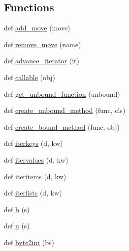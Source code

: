 \subsection*{Functions}
\begin{DoxyCompactItemize}
\item 
def \hyperlink{namespacepip_1_1__vendor_1_1urllib3_1_1packages_1_1six_ad933e7c61c57b643edcbbba25aa25472}{add\+\_\+move} (move)
\item 
def \hyperlink{namespacepip_1_1__vendor_1_1urllib3_1_1packages_1_1six_ab0e0d6749da646c42c4a26e1ebdfe100}{remove\+\_\+move} (name)
\item 
def \hyperlink{namespacepip_1_1__vendor_1_1urllib3_1_1packages_1_1six_abe9c731c8bba88cb511f8f21c81b66bb}{advance\+\_\+iterator} (it)
\item 
def \hyperlink{namespacepip_1_1__vendor_1_1urllib3_1_1packages_1_1six_aef9f895a42a18714e4285adafbe74571}{callable} (obj)
\item 
def \hyperlink{namespacepip_1_1__vendor_1_1urllib3_1_1packages_1_1six_a41cbae8b35e6bfb9c341b85e2ba3dffe}{get\+\_\+unbound\+\_\+function} (unbound)
\item 
def \hyperlink{namespacepip_1_1__vendor_1_1urllib3_1_1packages_1_1six_afb847343e841c1a14e0bb70e3fdda747}{create\+\_\+unbound\+\_\+method} (func, cls)
\item 
def \hyperlink{namespacepip_1_1__vendor_1_1urllib3_1_1packages_1_1six_ad2578848183116f74133f32c10a67993}{create\+\_\+bound\+\_\+method} (func, obj)
\item 
def \hyperlink{namespacepip_1_1__vendor_1_1urllib3_1_1packages_1_1six_a2b6e47d0f80720c134e343ce6b68e2eb}{iterkeys} (d, kw)
\item 
def \hyperlink{namespacepip_1_1__vendor_1_1urllib3_1_1packages_1_1six_aa4b83f4539ddaf27dce58d45989e8048}{itervalues} (d, kw)
\item 
def \hyperlink{namespacepip_1_1__vendor_1_1urllib3_1_1packages_1_1six_aa7d71fa1dd51c962ab46ceb81785488b}{iteritems} (d, kw)
\item 
def \hyperlink{namespacepip_1_1__vendor_1_1urllib3_1_1packages_1_1six_ae0abef6e81dd4cf6834a46a887f6bc86}{iterlists} (d, kw)
\item 
def \hyperlink{namespacepip_1_1__vendor_1_1urllib3_1_1packages_1_1six_a5f6bf0273cccc660b0816056e22e841c}{b} (s)
\item 
def \hyperlink{namespacepip_1_1__vendor_1_1urllib3_1_1packages_1_1six_aa8e82594d5b4d32aced73f19f99ad609}{u} (s)
\item 
def \hyperlink{namespacepip_1_1__vendor_1_1urllib3_1_1packages_1_1six_a9a1580485c766e35b758d6244475b672}{byte2int} (bs)

\end{DoxyCompactItemize}
